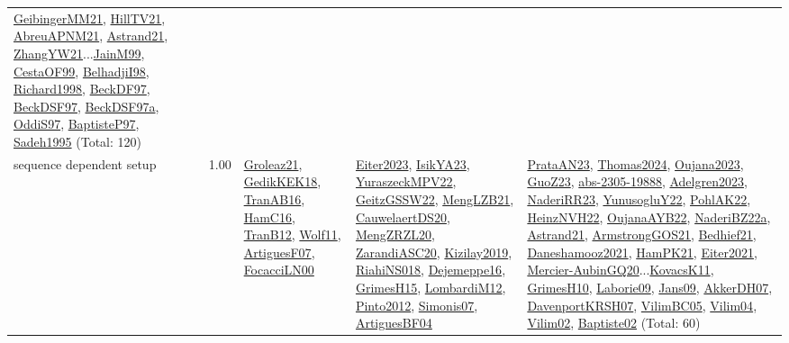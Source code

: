 {\begin{longtable}{p{3cm}r>{\raggedright\arraybackslash}p{6cm}>{\raggedright\arraybackslash}p{6cm}>{\raggedright\arraybackslash}p{8cm}}
\hyperref[detail:GeibingerMM21]{GeibingerMM21}, \hyperref[detail:HillTV21]{HillTV21}, \hyperref[detail:AbreuAPNM21]{AbreuAPNM21}, \hyperref[detail:Astrand21]{Astrand21}, \hyperref[detail:ZhangYW21]{ZhangYW21}...\hyperref[detail:JainM99]{JainM99}, \hyperref[detail:CestaOF99]{CestaOF99}, \hyperref[detail:BelhadjiI98]{BelhadjiI98}, \hyperref[detail:Richard1998]{Richard1998}, \hyperref[detail:BeckDF97]{BeckDF97}, \hyperref[detail:BeckDSF97]{BeckDSF97}, \hyperref[detail:BeckDSF97a]{BeckDSF97a}, \hyperref[detail:OddiS97]{OddiS97}, \hyperref[detail:BaptisteP97]{BaptisteP97}, \hyperref[detail:Sadeh1995]{Sadeh1995} (Total: 120)\\
\index{sequence dependent setup}\index{Concepts!sequence dependent setup}sequence dependent setup &  1.00 & \hyperref[detail:Groleaz21]{Groleaz21}, \hyperref[detail:GedikKEK18]{GedikKEK18}, \hyperref[detail:TranAB16]{TranAB16}, \hyperref[detail:HamC16]{HamC16}, \hyperref[detail:TranB12]{TranB12}, \hyperref[detail:Wolf11]{Wolf11}, \hyperref[detail:ArtiguesF07]{ArtiguesF07}, \hyperref[detail:FocacciLN00]{FocacciLN00} & \hyperref[detail:Eiter2023]{Eiter2023}, \hyperref[detail:IsikYA23]{IsikYA23}, \hyperref[detail:YuraszeckMPV22]{YuraszeckMPV22}, \hyperref[detail:GeitzGSSW22]{GeitzGSSW22}, \hyperref[detail:MengLZB21]{MengLZB21}, \hyperref[detail:CauwelaertDS20]{CauwelaertDS20}, \hyperref[detail:MengZRZL20]{MengZRZL20}, \hyperref[detail:ZarandiASC20]{ZarandiASC20}, \hyperref[detail:Kizilay2019]{Kizilay2019}, \hyperref[detail:RiahiNS018]{RiahiNS018}, \hyperref[detail:Dejemeppe16]{Dejemeppe16}, \hyperref[detail:GrimesH15]{GrimesH15}, \hyperref[detail:LombardiM12]{LombardiM12}, \hyperref[detail:Pinto2012]{Pinto2012}, \hyperref[detail:Simonis07]{Simonis07}, \hyperref[detail:ArtiguesBF04]{ArtiguesBF04} & \hyperref[detail:PrataAN23]{PrataAN23}, \hyperref[detail:Thomas2024]{Thomas2024}, \hyperref[detail:Oujana2023]{Oujana2023}, \hyperref[detail:GuoZ23]{GuoZ23}, \hyperref[detail:abs-2305-19888]{abs-2305-19888}, \hyperref[detail:Adelgren2023]{Adelgren2023}, \hyperref[detail:NaderiRR23]{NaderiRR23}, \hyperref[detail:YunusogluY22]{YunusogluY22}, \hyperref[detail:PohlAK22]{PohlAK22}, \hyperref[detail:HeinzNVH22]{HeinzNVH22}, \hyperref[detail:OujanaAYB22]{OujanaAYB22}, \hyperref[detail:NaderiBZ22a]{NaderiBZ22a}, \hyperref[detail:Astrand21]{Astrand21}, \hyperref[detail:ArmstrongGOS21]{ArmstrongGOS21}, \hyperref[detail:Bedhief21]{Bedhief21}, \hyperref[detail:Daneshamooz2021]{Daneshamooz2021}, \hyperref[detail:HamPK21]{HamPK21}, \hyperref[detail:Eiter2021]{Eiter2021}, \hyperref[detail:Mercier-AubinGQ20]{Mercier-AubinGQ20}...\hyperref[detail:KovacsK11]{KovacsK11}, \hyperref[detail:GrimesH10]{GrimesH10}, \hyperref[detail:Laborie09]{Laborie09}, \hyperref[detail:Jans09]{Jans09}, \hyperref[detail:AkkerDH07]{AkkerDH07}, \hyperref[detail:DavenportKRSH07]{DavenportKRSH07}, \hyperref[detail:VilimBC05]{VilimBC05}, \hyperref[detail:Vilim04]{Vilim04}, \hyperref[detail:Vilim02]{Vilim02}, \hyperref[detail:Baptiste02]{Baptiste02} (Total: 60)\\

\end{longtable}}
